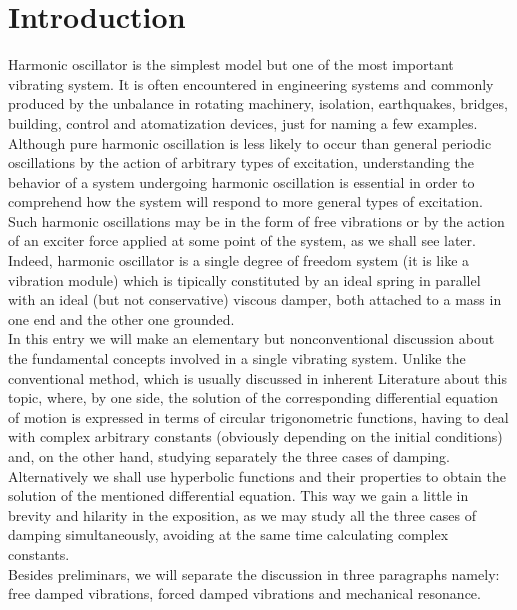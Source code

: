 \documentclass[12pt]{article}
\begin{document}
\section{Introduction}
Harmonic oscillator is the simplest model but one of the most important vibrating system. It is often encountered in engineering systems and commonly produced by the unbalance in rotating machinery, isolation, earthquakes, bridges, building, control and atomatization devices, just for naming a few examples. Although pure harmonic oscillation is less likely to occur than general periodic oscillations by the action of arbitrary types of excitation, understanding the behavior of a system undergoing harmonic oscillation is essential in order to comprehend how the system will respond to more general types of excitation. Such  harmonic oscillations may be in the form of free vibrations or by the action of an exciter force applied at some point of the system, as we shall see later. Indeed, harmonic oscillator is a single degree of freedom system (it is like a vibration module) which is tipically constituted by an ideal spring in parallel with an ideal (but not conservative) viscous damper, both attached to a mass in one end and the other one grounded. \\
In this entry  we will make an elementary but nonconventional discussion about the fundamental concepts involved in a single vibrating system. Unlike the conventional method, which is usually discussed in inherent Literature about this topic, where, by one side, the solution of the corresponding differential equation of motion is expressed in terms of circular trigonometric functions,  having to deal with complex arbitrary constants (obviously depending on the initial conditions) and, on the other hand, studying separately the three cases of damping. Alternatively we shall use  hyperbolic functions and their properties to obtain the solution of the mentioned differential equation. This way we gain a little in brevity and hilarity in the exposition, as we may study all the three cases of damping simultaneously,   avoiding at the same time calculating complex constants. \\
Besides preliminars, we will separate the discussion in three paragraphs namely: free damped vibrations, forced damped vibrations and mechanical resonance.
\end{document}
